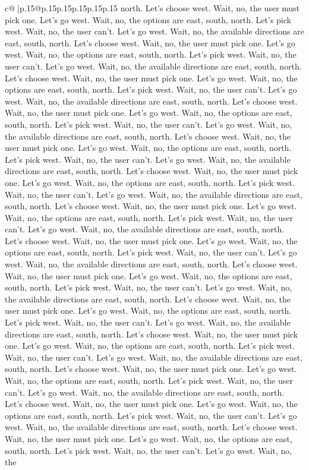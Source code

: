 \documentclass{article}
\begin{document}
{\begin{supertabular}{c@{$\;$}|p{.15\linewidth}@{}p{.15\linewidth}p{.15\linewidth}p{.15\linewidth}p{.15\linewidth}p{.15\linewidth}}
{{{north. Let's choose west. Wait, no, the user must pick one. Let's go west. Wait, no, the options are east, south, north. Let's pick west. Wait, no, the user can't. Let's go west. Wait, no, the available directions are east, south, north. Let's choose west. Wait, no, the user must pick one. Let's go west. Wait, no, the options are east, south, north. Let's pick west. Wait, no, the user can't. Let's go west. Wait, no, the available directions are east, south, north. Let's choose west. Wait, no, the user must pick one. Let's go west. Wait, no, the options are east, south, north. Let's pick west. Wait, no, the user can't. Let's go west. Wait, no, the available directions are east, south, north. Let's choose west. Wait, no, the user must pick one. Let's go west. Wait, no, the options are east, south, north. Let's pick west. Wait, no, the user can't. Let's go west. Wait, no, the available directions are east, south, north. Let's choose west. Wait, no, the user must pick one. Let's go west. Wait, no, the options are east, south, north. Let's pick west. Wait, no, the user can't. Let's go west. Wait, no, the available directions are east, south, north. Let's choose west. Wait, no, the user must pick one. Let's go west. Wait, no, the options are east, south, north. Let's pick west. Wait, no, the user can't. Let's go west. Wait, no, the available directions are east, south, north. Let's choose west. Wait, no, the user must pick one. Let's go west. Wait, no, the options are east, south, north. Let's pick west. Wait, no, the user can't. Let's go west. Wait, no, the available directions are east, south, north. Let's choose west. Wait, no, the user must pick one. Let's go west. Wait, no, the options are east, south, north. Let's pick west. Wait, no, the user can't. Let's go west. Wait, no, the available directions are east, south, north. Let's choose west. Wait, no, the user must pick one. Let's go west. Wait, no, the options are east, south, north. Let's pick west. Wait, no, the user can't. Let's go west. Wait, no, the available directions are east, south, north. Let's choose west. Wait, no, the user must pick one. Let's go west. Wait, no, the options are east, south, north. Let's pick west. Wait, no, the user can't. Let's go west. Wait, no, the available directions are east, south, north. Let's choose west. Wait, no, the user must pick one. Let's go west. Wait, no, the options are east, south, north. Let's pick west. Wait, no, the user can't. Let's go west. Wait, no, the available directions are east, south, north. Let's choose west. Wait, no, the user must pick one. Let's go west. Wait, no, the options are east, south, north. Let's pick west. Wait, no, the user can't. Let's go west. Wait, no, the available directions are east, south, north. Let's choose west. Wait, no, the user must pick one. Let's go west. Wait, no, the options are east, south, north. Let's pick west. Wait, no, the user can't. Let's go west. Wait, no, the available directions are east, south, north. Let's choose west. Wait, no, the user must pick one. Let's go west. Wait, no, the options are east, south, north. Let's pick west. Wait, no, the user can't. Let's go west. Wait, no, the }}}
\end{supertabular}}
\end{document}
